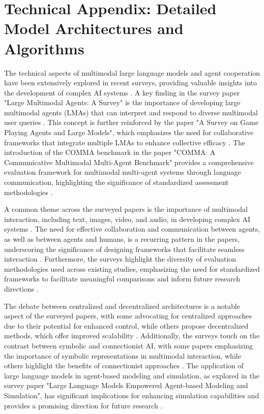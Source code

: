 \documentclass[conference]{IEEEtran}
\begin{document}
\section{Technical Appendix: Detailed Model Architectures and Algorithms}
The technical aspects of multimodal large language models and agent cooperation have been extensively explored in recent surveys, providing valuable insights into the development of complex AI systems \cite{b1}. A key finding in the survey paper "Large Multimodal Agents: A Survey" is the importance of developing large multimodal agents (LMAs) that can interpret and respond to diverse multimodal user queries \cite{b2}. This concept is further reinforced by the paper "A Survey on Game Playing Agents and Large Models", which emphasizes the need for collaborative frameworks that integrate multiple LMAs to enhance collective efficacy \cite{b3}. The introduction of the COMMA benchmark in the paper "COMMA: A Communicative Multimodal Multi-Agent Benchmark" provides a comprehensive evaluation framework for multimodal multi-agent systems through language communication, highlighting the significance of standardized assessment methodologies \cite{b4}.

A common theme across the surveyed papers is the importance of multimodal interaction, including text, images, video, and audio, in developing complex AI systems \cite{b5}. The need for effective collaboration and communication between agents, as well as between agents and humans, is a recurring pattern in the papers, underscoring the significance of designing frameworks that facilitate seamless interaction \cite{b6}. Furthermore, the surveys highlight the diversity of evaluation methodologies used across existing studies, emphasizing the need for standardized frameworks to facilitate meaningful comparisons and inform future research directions \cite{b7}.

The debate between centralized and decentralized architectures is a notable aspect of the surveyed papers, with some advocating for centralized approaches due to their potential for enhanced control, while others propose decentralized methods, which offer improved scalability \cite{b8}. Additionally, the surveys touch on the contrast between symbolic and connectionist AI, with some papers emphasizing the importance of symbolic representations in multimodal interaction, while others highlight the benefits of connectionist approaches \cite{b9}. The application of large language models in agent-based modeling and simulation, as explored in the survey paper "Large Language Models Empowered Agent-based Modeling and Simulation", has significant implications for enhancing simulation capabilities and provides a promising direction for future research \cite{b10}.
\end{document}
